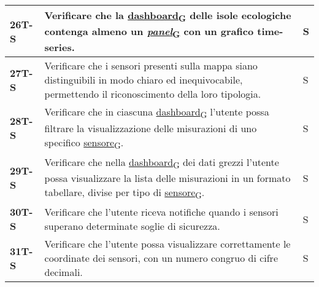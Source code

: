 \begin{longtable}{|>{\raggedright\arraybackslash}m{}|>{\raggedright\arraybackslash}m{}|>{\raggedright\arraybackslash}m{}|}
	\hline
	\textbf{26T-S}  & Verificare che la \href{https://7last.github.io/docs/pb/documentazione-interna/glossario\#dashboard}{dashboard\textsubscript{G}} delle isole ecologiche contenga almeno un \href{https://7last.github.io/docs/pb/documentazione-interna/glossario\#panel}{\textit{panel}\textsubscript{G}} con un grafico time-series.                                                                                   & S              \\
	\hline
	\textbf{27T-S}  & Verificare che i sensori presenti sulla mappa siano distinguibili in modo chiaro ed inequivocabile, permettendo il riconoscimento della loro tipologia.                                                                                                                                                                                                                                                  & S              \\
	\hline
	\textbf{28T-S}  & Verificare che in ciascuna \href{https://7last.github.io/docs/pb/documentazione-interna/glossario\#dashboard}{dashboard\textsubscript{G}} l’utente possa filtrare la visualizzazione delle misurazioni di uno specifico \href{https://7last.github.io/docs/pb/documentazione-interna/glossario\#sensore}{sensore\textsubscript{G}}.                                                                      & S              \\
	\hline
	\textbf{29T-S}  & Verificare che nella \href{https://7last.github.io/docs/pb/documentazione-interna/glossario\#dashboard}{dashboard\textsubscript{G}} dei dati grezzi l’utente possa visualizzare la lista delle misurazioni in un formato tabellare, divise per tipo di \href{https://7last.github.io/docs/pb/documentazione-interna/glossario\#sensore}{sensore\textsubscript{G}}.                                       & S              \\ %
	\hline
	\textbf{30T-S}  & Verificare che l’utente riceva notifiche quando i sensori superano determinate soglie di sicurezza.                                                                                                                                                                                                                                                                                                      & S              \\
	\hline
	\textbf{31T-S}  & Verificare che l’utente possa visualizzare correttamente le coordinate dei sensori, con un numero congruo di cifre decimali.                                                                                                                                                                                                                                                                             & S              \\

\end{longtable}
